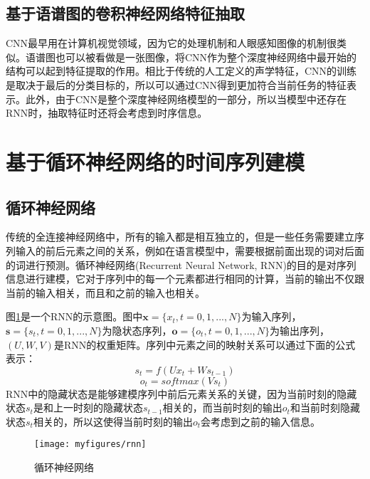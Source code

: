 \subsection{基于语谱图的卷积神经网络特征抽取}
\label{ssec:cnn_spectrogram_feature_extract}

CNN最早用在计算机视觉领域，因为它的处理机制和人眼感知图像的机制很类似。语谱图也可以被看做是一张图像，将CNN作为整个深度神经网络中最开始的结构可以起到特征提取的作用。相比于传统的人工定义的声学特征，CNN的训练是取决于最后的分类目标的，所以可以通过CNN得到更加符合当前任务的特征表示。此外，由于CNN是整个深度神经网络模型的一部分，所以当模型中还存在RNN时，抽取特征时还将会考虑到时序信息。

\section{基于循环神经网络的时间序列建模}
\label{sec:rnn_seq_model}

\subsection{循环神经网络}
\label{ssec:rnn}

传统的全连接神经网络中，所有的输入都是相互独立的，但是一些任务需要建立序列输入的前后元素之间的关系，例如在语言模型中，需要根据前面出现的词对后面的词进行预测。循环神经网络(Recurrent Neural Network, RNN)的目的是对序列信息进行建模，它对于序列中的每一个元素都进行相同的计算，当前的输出不仅跟当前的输入相关，而且和之前的输入也相关。

图\ref{fig:rnn}是一个RNN的示意图。图中$\mathbf{x}=\{x_t, t=0,1,...,N\}$为输入序列，$\mathbf{s}=\{s_t, t=0,1,...,N\}$为隐状态序列，$\mathbf{o}=\{o_t, t=0,1,...,N\}$为输出序列，$(U, W, V)$是RNN的权重矩阵。序列中元素之间的映射关系可以通过下面的公式表示：
\begin{equation}
\label{equ:rnn_cal_state}
    s_t = f(Ux_t + Ws_{t-1})
\end{equation}
\begin{equation}
\label{equ:rnn_cal_output}
    o_t = softmax(Vs_t)
\end{equation}
RNN中的隐藏状态是能够建模序列中前后元素关系的关键，因为当前时刻的隐藏状态$s_t$是和上一时刻的隐藏状态$s_{t-1}$相关的，而当前时刻的输出$o_t$和当前时刻隐藏状态$s_t$相关的，所以这使得当前时刻的输出$o_t$会考虑到之前的输入信息。

\begin{figure}[htb] %
    \centering
    \texttt{[image: myfigures/rnn]}
    \caption{循环神经网络}
    \label{fig:rnn}
\end{figure}

